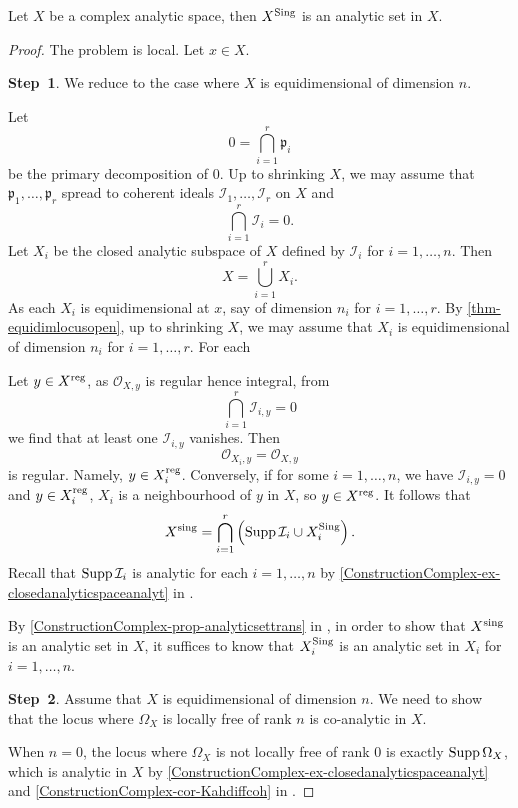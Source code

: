 \begin{thm}\label{thm-Xsingana}
    Let $X$ be a complex analytic space, then $X^{\operatorname{Sing}}$ is an analytic set in $X$.
\end{thm}
\begin{proof}
    The problem is local. Let $x\in X$.

    \textbf{Step~1}. We reduce to the case where $X$ is equidimensional of dimension $n$.

    Let 
    \[
        0=\bigcap_{i=1}^r \mathfrak{p}_i  
    \]
    be the primary decomposition of $0$. Up to shrinking $X$, we may assume that $\mathfrak{p}_1,\ldots,\mathfrak{p}_r$ spread to coherent ideals $\mathcal{I}_1,\ldots,\mathcal{I}_r$ on $X$ and 
    \[
        \bigcap_{i=1}^r\mathcal{I}_i=0.  
    \]
    Let $X_i$ be the closed analytic subspace of $X$ defined by $\mathcal{I}_i$ for $i=1,\ldots,n$. Then
    \[
        X=\bigcup_{i=1}^r X_i.  
    \]
    As each $X_i$ is equidimensional at $x$, say of dimension $n_i$ for $i=1,\ldots,r$. By \cref{thm-equidimlocusopen}, up to shrinking $X$, we may assume that $X_i$ is equidimensional of dimension $n_i$ for $i=1,\ldots,r$. For each
    
    Let $y\in X^{\operatorname{reg}}$, as $\mathcal{O}_{X,y}$ is regular hence integral, from 
    \[
        \bigcap_{i=1}^r\mathcal{I}_{i,y}=0  
    \]
    we find that at least one $\mathcal{I}_{i,y}$ vanishes. Then
    \[
        \mathcal{O}_{X_i,y}=\mathcal{O}_{X,y}  
    \]
    is regular. Namely, $y\in X_i^{\operatorname{reg}}$.
    Conversely, if for some $i=1,\ldots,n$, we have $\mathcal{I}_{i,y}=0$ and $y\in X_i^{\operatorname{reg}}$, $X_i$ is a neighbourhood of $y$ in $X$, so $y\in X^{\operatorname{reg}}$. It follows that 
    \[
        X^{\operatorname{sing}}=\bigcap_{i=1}^r \left(\operatorname{Supp} \mathcal{I}_i \cup X_i^{\operatorname{Sing}} \right). 
    \]
    Recall that $\operatorname{Supp} \mathcal{I}_i$ is analytic for each $i=1,\ldots,n$ by \cref{ConstructionComplex-ex-closedanalyticspaceanalyt} in . 
    
    By \cref{ConstructionComplex-prop-analyticsettrans} in , in order to show that $X^{\operatorname{sing}}$ is an analytic set in $X$, it suffices to know that $X_i^{\operatorname{Sing}} $ is an analytic set in $X_i$ for $i=1,\ldots,n$. 

    \textbf{Step~2}. Assume that $X$ is equidimensional of dimension $n$. We need to show that the locus where $\Omega_{X}$ is locally free of rank $n$ is co-analytic in $X$.

    When $n=0$, the locus where $\Omega_X$ is not locally free of rank $0$ is exactly $\operatorname{Supp} \Omega_X$, which is analytic in $X$ by \cref{ConstructionComplex-ex-closedanalyticspaceanalyt} and \cref{ConstructionComplex-cor-Kahdiffcoh}  in .


\end{proof}
